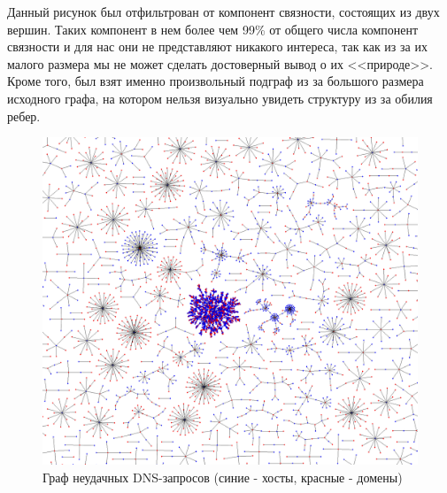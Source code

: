 \documentclass[a4paper,14pt]{extreport} %
\begin{document}
Данный рисунок был отфильтрован от компонент связности, состоящих из двух вершин. Таких компонент в нем более чем 99\% от общего числа компонент связности и для нас они не представляют никакого интереса, так как из за их малого размера мы не может сделать достоверный вывод о их <<природе>>. Кроме того, был взят именно произвольный подграф из за большого размера исходного графа, на котором нельзя визуально увидеть структуру из за обилия ребер.
\\
\begin{figure}[H]
	\center
	\includegraphics[width=0.9\linewidth]{fail-graph.png}
	\caption{Граф неудачных DNS-запросов (синие - хосты, красные - домены)}
				
	\label{fig:subim1}
\end{figure}
	
\end{document}
